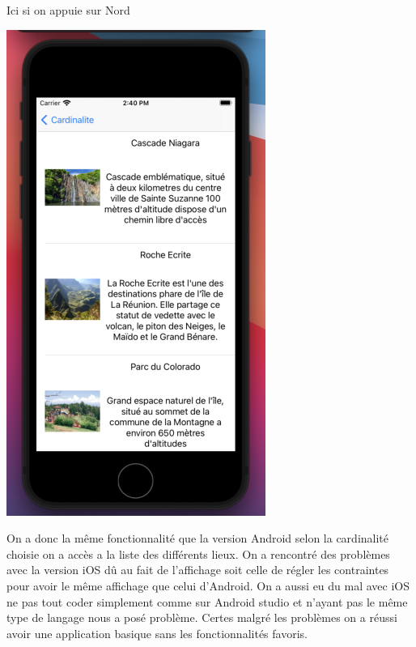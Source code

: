 \documentclass{article}
\begin{document}
\begin{minipage}{0.25\textwidth}
Ici si on appuie sur Nord
\end{minipage}
\begin{minipage}{0.4\textwidth}
\includegraphics[width=\textwidth]{ios2.png}
\end{minipage}
On a donc la même fonctionnalité que la version Android selon la cardinalité choisie on a accès a la liste des différents lieux.
On a rencontré des problèmes avec la version iOS dû au fait de l'affichage soit celle de régler les contraintes pour avoir le même affichage que celui d'Android.
On a aussi eu du mal avec iOS ne pas tout coder simplement comme sur Android studio et n’ayant pas le même type de langage nous a posé problème.
\newline
Certes malgré les problèmes on a réussi avoir une application basique  sans les fonctionnalités favoris.
\end{document}
